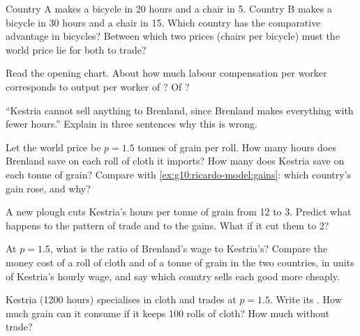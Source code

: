 \begin{exercise}[$\star$]\label{exo:g10:ricardo-model:3}
Country A makes a bicycle in 20 hours and a chair in 5. Country B makes a bicycle in 30 hours and a chair in
15. Which country has the comparative advantage in bicycles? Between which two prices (chairs per bicycle) must
the world price lie for both to trade?
\end{exercise}

\begin{exercise}[$\star$]\label{exo:g10:ricardo-model:4}
Read the opening chart. About how much labour compensation per worker corresponds to output per worker of
? Of ?
\end{exercise}

\begin{exercise}[$\star$]\label{exo:g10:ricardo-model:5}
``Kestria cannot sell anything to Brenland, since Brenland makes everything with fewer hours.'' Explain in three
sentences why this is wrong.
\end{exercise}

\begin{exercise}[$\star\star$]\label{exo:g10:ricardo-model:6}
Let the world price be $p = 1.5$ tonnes of grain per roll. How many hours does Brenland save on each roll of
cloth it imports? How many does Kestria save on each tonne of grain? Compare with
\cref{ex:g10:ricardo-model:gains}: which country's gain rose, and why?
\end{exercise}

\begin{exercise}[$\star\star$]\label{exo:g10:ricardo-model:7}
A new plough cuts Kestria's hours per tonne of grain from 12 to 3. Predict what happens to the pattern of trade
and to the gains. What if it cut them to 2?
\end{exercise}

\begin{exercise}[$\star\star$]\label{exo:g10:ricardo-model:8}
At $p = 1.5$, what is the ratio of Brenland's wage to Kestria's? Compare the money cost of a roll of cloth and
of a tonne of grain in the two countries, in units of Kestria's hourly wage, and say which country sells each
good more cheaply.
\end{exercise}

\begin{exercise}[$\star\star$]\label{exo:g10:ricardo-model:9}
Kestria (\num{1200} hours) specialises in cloth and trades at $p = 1.5$. Write its . How much grain can it consume if it keeps 100 rolls of cloth? How much without trade?
\end{exercise}

